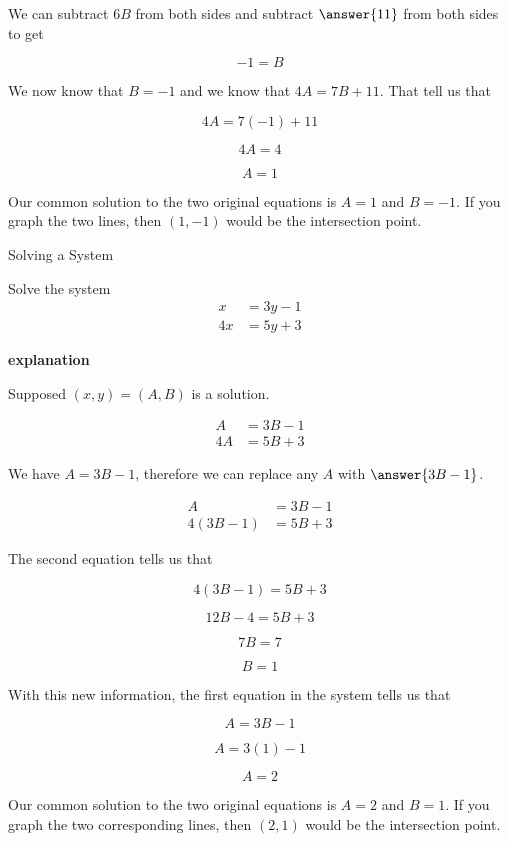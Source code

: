 \documentclass{ximera}
\begin{document}
\begin{example}
We can subtract $6B$ from both sides and subtract $\answer{11}$ from both sides to get


\[   -1 =  B   \]



We now know that $B = -1$ and we know that $4 A = 7 B + 11$.  That tell us that 


\[   4 A = 7(-1) + 11   \]

\[   4 A = 4   \]


\[ A = 1 \]


Our common solution to the two original equations is $A = 1$ and $B = -1$.  If you graph the two lines, then $(1, -1)$ would be the intersection point.


\end{example}












\begin{example} Solving a System


Solve the system
\begin{align*}
x & = 3 y - 1 \\
4 x & = 5 y + 3
\end{align*}

\textbf{\textcolor{red!75!green}{explanation}} 


Supposed $(x, y) = (A, B)$ is a solution.


\begin{align*}
A & = 3 B - 1 \\
4A  & = 5 B + 3
\end{align*}


We have $A = 3B - 1$, therefore we can replace any $A$ with $\answer{3B - 1}$.  

\begin{align*}
A & = 3 B - 1 \\
4 (3 B - 1) & = 5 B + 3
\end{align*}


The second equation tells us that 


\[   4(3B - 1) = 5B + 3   \]

\[   12B - 4 = 5B + 3   \]


\[ 7B = 7 \]


\[ B = 1 \]

With this new information, the first equation in the system tells us that

\[ A = 3B - 1 \]

\[ A = 3(1) - 1 \]

\[ A = 2 \]

Our common solution to the two original equations is $A = 2$ and $B = 1$.  If you graph the two corresponding lines, then $(2, 1)$ would be the intersection point.


\end{example}
\end{document}
